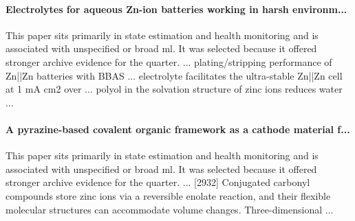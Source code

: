 \documentclass[conference]{IEEEtran}
\begin{document}
\paragraph{Electrolytes for aqueous Zn-ion batteries working in harsh environm...} This paper sits primarily in state estimation and health monitoring and is associated with unspecified or broad ml. It was selected because it offered stronger archive evidence for the quarter. ... plating/stripping performance of Zn||Zn batteries with BBAS ... electrolyte facilitates the ultra-stable Zn||Zn cell at 1 mA cm2 over ... polyol in the solvation structure of zinc ions reduces water ... \cite{electrolytesforaqueous2025}

\paragraph{A pyrazine-based covalent organic framework as a cathode material f...} This paper sits primarily in state estimation and health monitoring and is associated with unspecified or broad ml. It was selected because it offered stronger archive evidence for the quarter. ... [2932] Conjugated carbonyl compounds store zinc ions via a reversible enolate reaction, and their flexible molecular structures can accommodate volume changes. Three-dimensional ... \cite{apyrazinebased2026}
\end{document}
